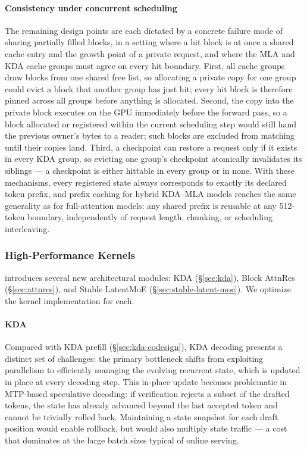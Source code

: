 \paragraph{Consistency under concurrent scheduling}
The remaining design points are each dictated by a concrete failure mode of sharing partially filled blocks, in a setting where a hit block is at once a shared cache entry and the growth point of a private request, and where the MLA and KDA cache groups must agree on every hit boundary.
First, all cache groups draw blocks from one shared free list, so allocating a private copy for one group could evict a block that another group has just hit; every hit block is therefore pinned across all groups before anything is allocated.
Second, the copy into the private block executes on the GPU immediately before the forward pass, so a block allocated or registered within the current scheduling step would still hand the previous owner's bytes to a reader; such blocks are excluded from matching until their copies land.
Third, a checkpoint can restore a request only if it exists in every KDA group, so evicting one group's checkpoint atomically invalidates its siblings --- a checkpoint is either hittable in every group or in none.
With these mechanisms, every registered state always corresponds to exactly its declared token prefix, and prefix caching for hybrid KDA--MLA models reaches the same generality as for full-attention models: any shared prefix is reusable at any 512-token boundary, independently of request length, chunking, or scheduling interleaving.



\subsubsection{High-Performance Kernels}
 introduces several new architectural modules: KDA (\S\ref{sec:kda}), Block AttnRes (\S\ref{sec:attnres}), and Stable LatentMoE (\S\ref{sec:stable-latent-moe}). We optimize the kernel implementation for each.

\paragraph{KDA}
\label{sec:kda-decoding}

Compared with KDA prefill (\S\ref{sec:kda-codesign}), KDA decoding presents a distinct set of challenges: the primary bottleneck shifts from exploiting parallelism to efficiently managing the evolving recurrent state, which is updated in place at every decoding step. This in-place update becomes problematic in MTP-based speculative decoding: if verification rejects a subset of the drafted tokens, the state has already advanced beyond the last accepted token and cannot be trivially rolled back. Maintaining a state snapshot for each draft position would enable rollback, but would also multiply state traffic --- a cost that dominates at the large batch sizes typical of online serving.


